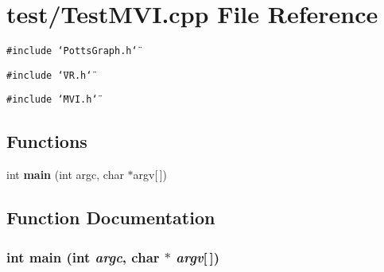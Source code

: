 \section{test/TestMVI.cpp File Reference}
\label{TestMVI_8cpp}
{\tt \#include \char`\"{}PottsGraph.h\char`\"{}}\par
{\tt \#include \char`\"{}VR.h\char`\"{}}\par
{\tt \#include \char`\"{}MVI.h\char`\"{}}\par
\subsection*{Functions}
\begin{CompactItemize}
\item 
int {\bf main} (int argc, char $\ast$argv[$\,$])
\end{CompactItemize}


\subsection{Function Documentation}
\subsubsection{\setlength{\rightskip}{0pt plus 5cm}int main (int {\em argc}, char $\ast$ {\em argv}[$\,$])}\label{TestMVI_8cpp_28052c36c3b61c6c0eaa18f5d226118f}


